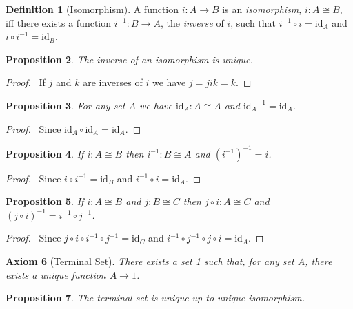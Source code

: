 \documentclass{book}
\let\qed\relax
\newtheorem{ax}{Axiom}[chapter]
\newtheorem{prop}[ax]{Proposition}
\theoremstyle{definition}
\newtheorem{df}[ax]{Definition}
\newcommand{\id}[1]{\ensuremath{\mathrm{id}_{#1}}}
\newcommand{\inv}[1]{\ensuremath{{#1}^{-1}}}
\begin{document}
\begin{df}[Isomorphism]
A function $i : A \rightarrow B$ is an \emph{isomorphism}, $i : A \cong B$, iff there exists a function $\inv{i} : B \rightarrow A$, the \emph{inverse} of $i$, such that $\inv{i} \circ i = \id{A}$ and $i \circ \inv{i} = \id{B}$.
\end{df}

\begin{prop}
The inverse of an isomorphism is unique.
\end{prop}

\begin{proof}
\pf\ If $j$ and $k$ are inverses of $i$ we have $j = jik = k$. \qed
\end{proof}

\begin{prop}
For any set $A$ we have $\id{A} : A \cong A$ and $\inv{\id{A}} = \id{A}$.
\end{prop}

\begin{proof}
\pf\ Since $\id{A} \circ \id{A} = \id{A}$. \qed
\end{proof}

\begin{prop}
If $i : A \cong B$ then $\inv{i} : B \cong A$ and $\inv{(\inv{i})} = i$.
\end{prop}

\begin{proof}
\pf\ Since $i \circ \inv{i} = \id{B}$ and $\inv{i} \circ i = \id{A}$. \qed
\end{proof}

\begin{prop}
If $i : A \cong B$ and $j : B \cong C$ then $j \circ i : A \cong C$ and $\inv{(j \circ i)} = \inv{i} \circ \inv{j}$.
\end{prop}

\begin{proof}
\pf\ Since $j \circ i \circ \inv{i} \circ \inv{j} = \id{C}$ and $\inv{i} \circ \inv{j} \circ j \circ i = \id{A}$. \qed
\end{proof}

\begin{ax}[Terminal Set]
There exists a set 1 such that, for any set $A$, there exists a unique function $A \rightarrow 1$.
\end{ax}

\begin{prop}
The terminal set is unique up to unique isomorphism.
\end{prop}
\end{document}
